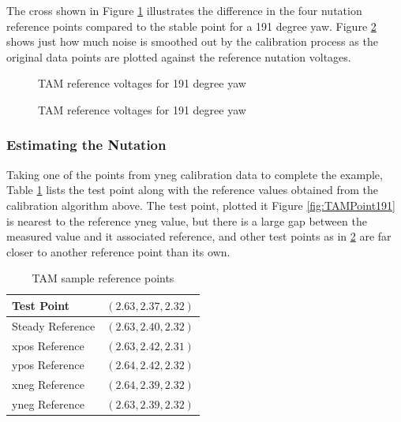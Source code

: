 The cross shown in Figure \ref{fig:TAMRef191} illustrates the difference in the four nutation reference points compared to the stable point for a 191 degree yaw.  Figure \ref{fig:TAMPoints191} shows just how much noise is smoothed out by the calibration process as the original data points are plotted against the reference nutation voltages.

\begin{figure}[H]
  \centerline{}
  \caption{TAM reference voltages for 191 degree yaw}
  \label{fig:TAMRef191}
\end{figure}

\begin{figure}[H]
  \centerline{}
  \caption{TAM reference voltages for 191 degree yaw}
  \label{fig:TAMPoints191}
\end{figure}

\subsubsection{Estimating the Nutation}

Taking one of the points from yneg calibration data to complete the example, Table \ref{tbl:TAMSamplePoints} lists the test point along with the reference values obtained from the calibration algorithm above.  The test point, plotted it Figure \ref{fig:TAMPoint191} is nearest to the reference yneg value, but there is a large gap between the measured value and it associated reference, and other test points as in \ref{fig:TAMPoints191} are far closer to another reference point than its own.

\begin{table}[H]
  \centering
  \begin{tabular}{lc}
    \hline
    Test Point       & $(2.63, 2.37, 2.32)$ \\ \hline
    Steady Reference & $(2.63, 2.40, 2.32)$ \\ \hline
    xpos Reference   & $(2.63, 2.42, 2.31)$ \\ \hline
    ypos Reference   & $(2.64, 2.42, 2.32)$ \\ \hline
    xneg Reference   & $(2.64, 2.39, 2.32)$ \\ \hline
    yneg Reference   & $(2.63, 2.39, 2.32)$ \\ \hline
  \end{tabular}
  \caption{TAM sample reference points}
  \label{tbl:TAMSamplePoints}
\end{table}


